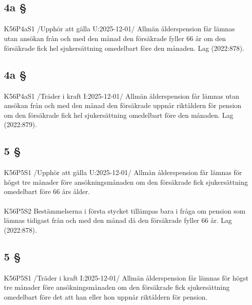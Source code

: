 \documentclass[a4paper,notitlepage,openany,10pt]{book}
\begin{document}
\subsection*{4a §}
\paragraph*{}
{\tiny K56P4aS1}
/Upphör att gälla U:2025-12-01/
Allmän ålderspension får lämnas utan ansökan från och med den månad den försäkrade fyller 66 år om den försäkrade fick hel sjukersättning omedelbart före den månaden.
Lag (2022:878).
\subsection*{4a §}
\paragraph*{}
{\tiny K56P4aS1}
/Träder i kraft I:2025-12-01/
Allmän ålderspension får lämnas utan ansökan från och med den månad den försäkrade uppnår riktåldern för pension om den försäkrade fick hel sjukersättning omedelbart före den månaden.
Lag (2022:879).
\subsection*{5 §}
\paragraph*{}
{\tiny K56P5S1}
/Upphör att gälla U:2025-12-01/
Allmän ålderspension får lämnas för högst tre månader före ansökningsmånaden om den försäkrade fick sjukersättning omedelbart före 66 års ålder.
\paragraph*{}
{\tiny K56P5S2}
Bestämmelserna i första stycket tillämpas bara i fråga om pension som lämnas tidigast från och med den månad då den försäkrade fyller 66 år.
Lag (2022:878).
\subsection*{5 §}
\paragraph*{}
{\tiny K56P5S1}
/Träder i kraft I:2025-12-01/
Allmän ålderspension får lämnas för högst tre månader före ansökningsmånaden om den försäkrade fick sjukersättning omedelbart före det att han eller hon uppnår riktåldern för pension.
\end{document}

